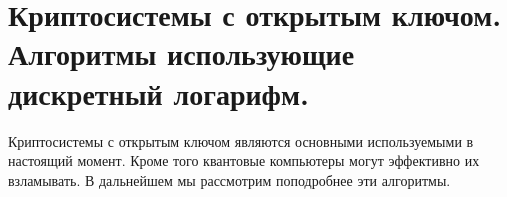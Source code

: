 \chapter{Криптосистемы с открытым ключом. Алгоритмы использующие
  дискретный логарифм.}
Криптосистемы с открытым ключом являются основными используемыми в
настоящий момент. Кроме того квантовые компьютеры могут эффективно их
взламывать. В дальнейшем мы рассмотрим поподробнее эти алгоритмы.





